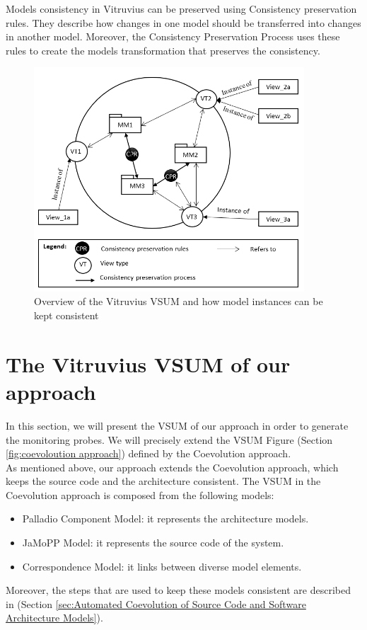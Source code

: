 Models consistency in Vitruvius can be preserved using Consistency preservation rules. They describe how changes in one model should be transferred into changes in another model. Moreover, the Consistency Preservation Process uses these rules to create the models transformation that preserves the consistency.\\


\begin{figure}[h]
\centering
\includegraphics[width=0.9\textwidth]{figures/vitruv_vsum}
\caption{Overview of the Vitruvius VSUM and how model instances can be kept consistent}
\label{fig:vitruv_vsum}
\end{figure}



\section{The Vitruvius VSUM of our approach}
\label{sec:The Vitruvius VSUM of our approach}

In this section, we will present the VSUM of our approach in order to generate the monitoring probes. We will precisely extend the VSUM Figure (Section \ref{fig:coevoloution approach}) defined by the Coevolution approach.\\

As mentioned above, our approach extends the Coevolution approach, which keeps the source code and the architecture consistent. The VSUM in the Coevolution approach is composed from the following models:
\begin{itemize}
\item Palladio Component Model: it represents the architecture models.
\item JaMoPP Model: it represents the source code of the system.
\item Correspondence Model: it links between diverse model elements.
\end{itemize}
Moreover, the steps that are used to keep these models consistent are described in (Section \ref{sec:Automated Coevolution of Source Code and Software Architecture Models}). \\

